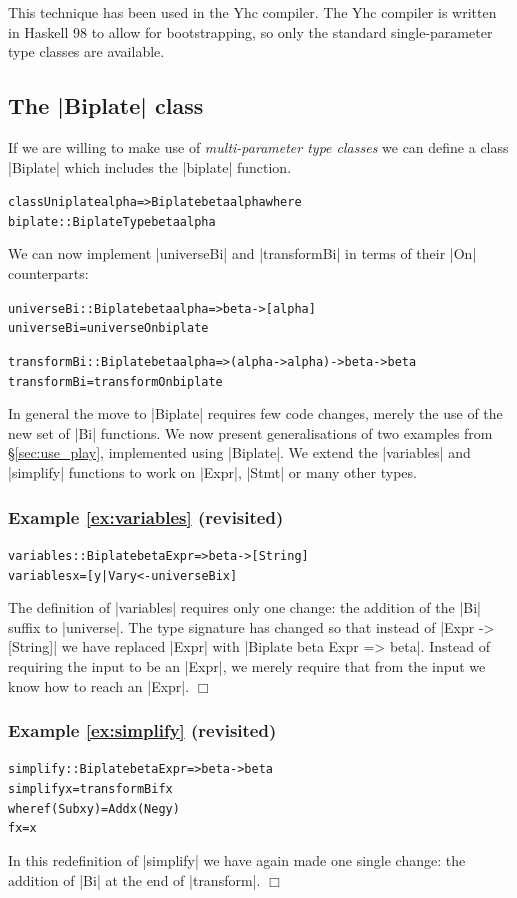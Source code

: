 \documentclass[preprint]{sigplanconf}
\let\cite=\citep
\newcommand{\noexample}{\hfill$\Box$}
\newenvironment{code}{\begin{alltt}\small}{\end{alltt}}
\newenvironment{revisit}[1]{\subsubsection*{Example #1 (revisited)}}{\noexample}
\newcommand{\ignore}{}
\begin{document}
This technique has been used in the Yhc compiler. The Yhc compiler is written in Haskell 98 to allow for bootstrapping, so only the standard single-parameter type classes are available.

\subsection{The |Biplate| class}

If we are willing to make use of \textit{multi-parameter type classes} \cite{jones:mptc} we can define a class |Biplate| which includes the |biplate| function.

\begin{code}
class  Uniplate alpha => Biplate beta alpha where
       biplate :: BiplateType beta alpha
\end{code}

We can now implement |universeBi| and |transformBi| in terms of their |On| counterparts:

\begin{code}
universeBi   :: Biplate beta alpha => beta -> [alpha]
universeBi   = universeOn   biplate

transformBi  :: Biplate beta alpha => (alpha -> alpha) -> beta -> beta
transformBi  = transformOn  biplate
\end{code}

In general the move to |Biplate| requires few code changes, merely the use of the new set of |Bi| functions. We now present generalisations of two examples from \S\ref{sec:use_play}, implemented using |Biplate|. We extend the |variables| and |simplify| functions to work on |Expr|, |Stmt| or many other types.

\begin{revisit}{\ref{ex:variables}}
\begin{code}
variables :: Biplate beta Expr => beta -> [String]
variables x = [y | Var y <- universeBi x]
\end{code}

The definition of |variables| requires only one change: the addition of the |Bi| suffix to |universe|. The type signature has changed so that instead of \ignore|Expr -> [String]| we have replaced |Expr| with \ignore|Biplate beta Expr => beta|. Instead of requiring the input to be an |Expr|, we merely require that from the input we know how to reach an |Expr|.
\end{revisit}

\begin{revisit}{\ref{ex:simplify}}
\begin{code}
simplify :: Biplate beta Expr => beta -> beta
simplify x = transformBi f x
    where  f (Sub x y)  = Add x (Neg y)
           f x          = x
\end{code}

In this redefinition of |simplify| we have again made one single change: the addition of |Bi| at the end of |transform|.
\end{revisit}
\end{document}
